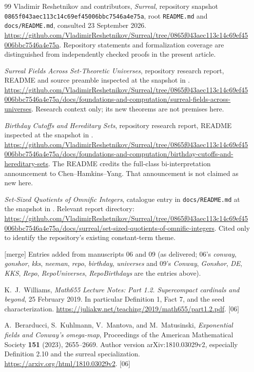 \documentclass[11pt,letterpaper]{article}
\numberwithin{equation}{section}
\theoremstyle{definition}
\theoremstyle{remark}
\newcommand{\src}[1]{\textup{\textsf{\small[#1]}}}%
\newcommand{\mergetag}{\textup{\textsf{\small[merge]}}}%
\begin{document}
\begin{thebibliography}{99}
Vladimir Reshetnikov and contributors,
\emph{Surreal}, repository snapshot
\texttt{0865f043aec113c14c69ef45006bbc7546a4e75a},
root \texttt{README.md} and \texttt{docs/README.md},
consulted 23 September 2026.
\url{https://github.com/VladimirReshetnikov/Surreal/tree/0865f043aec113c14c69ef45006bbc7546a4e75a}.
Repository statements and formalization coverage are distinguished from
independently checked proofs in the present article.

\emph{Surreal Fields Across Set-Theoretic Universes},
repository research report, README and source preamble inspected at the
snapshot in \cite{Repo}.
\url{https://github.com/VladimirReshetnikov/Surreal/tree/0865f043aec113c14c69ef45006bbc7546a4e75a/docs/foundations-and-computation/surreal-fields-across-universes}.
Research context only; its new theorems are not premises here.

\emph{Birthday Cutoffs and Hereditary Sets},
repository research report, README inspected at the snapshot in \cite{Repo}.
\url{https://github.com/VladimirReshetnikov/Surreal/tree/0865f043aec113c14c69ef45006bbc7546a4e75a/docs/foundations-and-computation/birthday-cutoffs-and-hereditary-sets}.
The README credits the full-class bi-interpretation announcement to
Chen--Hamkins--Yang. That announcement is not claimed as new here.

\emph{Set-Sized Quotients of Omnific Integers},
catalogue entry in \texttt{docs/README.md} at the snapshot in \cite{Repo}.
Relevant report directory:
\url{https://github.com/VladimirReshetnikov/Surreal/tree/0865f043aec113c14c69ef45006bbc7546a4e75a/docs/surreal/set-sized-quotients-of-omnific-integers}.
Cited only to identify the repository's existing constant-term theme.

\medskip\noindent\mergetag{} Entries added from manuscripts 06 and 09
(as delivered; 06's \emph{conway}, \emph{gonshor}, \emph{kks}, \emph{neeman},
\emph{repo}, \emph{birthday}, \emph{universes} and 09's \emph{Conway},
\emph{Gonshor}, \emph{DE}, \emph{KKS}, \emph{Repo}, \emph{RepoUniverses},
\emph{RepoBirthdays} are the entries above).

K.~J.~Williams,
\emph{Math655 Lecture Notes: Part 1.2. Supercompact cardinals and beyond},
25 February 2019.
In particular Definition 1, Fact 7, and the seed characterization.
\url{https://juliakw.net/teaching/2019/math655/part1.2.pdf}. \src{06}

A.~Berarducci, S.~Kuhlmann, V.~Mantova, and M.~Matusinski,
\emph{Exponential fields and Conway's omega-map},
Proceedings of the American Mathematical Society \textbf{151} (2023),
2655--2669.
Author version arXiv:1810.03029v2, especially Definition 2.10 and the
surreal specialization.
\url{https://arxiv.org/html/1810.03029v2}. \src{06}


\end{thebibliography}
\end{document}
